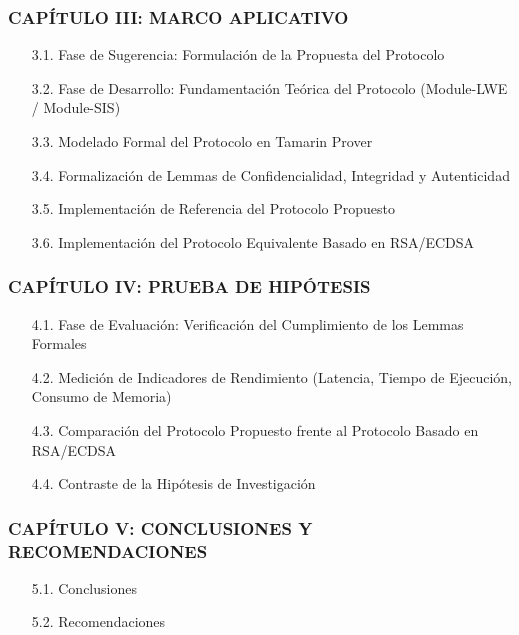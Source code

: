 \subsubsection*{CAPÍTULO III: MARCO APLICATIVO}
\begin{itemize}
	\item[3.1.] Fase de Sugerencia: Formulación de la Propuesta del Protocolo
	\item[3.2.] Fase de Desarrollo: Fundamentación Teórica del Protocolo (Module-LWE / Module-SIS)
	\item[3.3.] Modelado Formal del Protocolo en Tamarin Prover
	\item[3.4.] Formalización de Lemmas de Confidencialidad, Integridad y Autenticidad
	\item[3.5.] Implementación de Referencia del Protocolo Propuesto
	\item[3.6.] Implementación del Protocolo Equivalente Basado en RSA/ECDSA
\end{itemize}

\subsubsection*{CAPÍTULO IV: PRUEBA DE HIPÓTESIS}
\begin{itemize}
	\item[4.1.] Fase de Evaluación: Verificación del Cumplimiento de los Lemmas Formales
	\item[4.2.] Medición de Indicadores de Rendimiento (Latencia, Tiempo de Ejecución, Consumo de Memoria)
	\item[4.3.] Comparación del Protocolo Propuesto frente al Protocolo Basado en RSA/ECDSA
	\item[4.4.] Contraste de la Hipótesis de Investigación
\end{itemize}

\subsubsection*{CAPÍTULO V: CONCLUSIONES Y RECOMENDACIONES}
\begin{itemize}
	\item[5.1.] Conclusiones
	\item[5.2.] Recomendaciones
\end{itemize}

\endgroup
